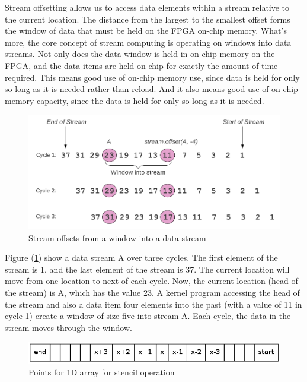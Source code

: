 Stream offsetting allows us to access data elements within a stream
relative to the current location\cite{maxcompiler_tutorial}. The distance
from the largest to the smallest offset forms the window of data that must
be held on the FPGA on-chip memory. What's more, the core concept of stream
computing is operating on windows into data streams. Not only does the data
window is held in on-chip memory on the FPGA, and the data items are held
on-chip for exactly the amount of time required. This means good use of
on-chip memory use, since data is held for only so long as it is needed
rather than reload. And it also means good use of on-chip memory capacity,
since the data is held for only so long as it is needed.

\begin{figure}
  \centering
  \includegraphics[scale=0.4]{img/window.png}
  \caption{Stream offsets from a window into a data stream}
  \label{fig:stream_window}
\end{figure}

Figure (\ref{fig:stream_window}) show a data stream A over three cycles.
The first element of the stream is 1, and the last element of the stream is
37. The current location will move from one location to next of each cycle.
Now, the current location (head of the stream) is A, which has the value
23. A kernel program accessing the head of the stream and also a data item
four elements into the past (with a value of 11 in cycle 1) create a window
of size five into stream A. Each cycle, the data in the stream moves
through the window.

\begin{figure}
  \centering
  \includegraphics[scale=0.5]{img/array.png}
  \caption{Points for 1D array for stencil operation}
  \label{fig:array}
\end{figure}

